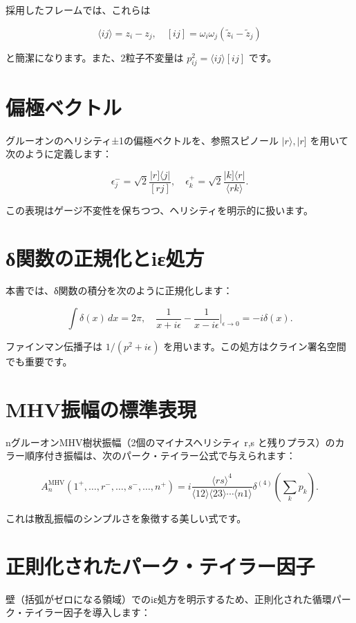 \documentclass[dvipdfmx,a4paper]{jsbook}
\theoremstyle{definition}
\theoremstyle{remark}
\begin{document}
採用したフレームでは、これらは

\[
\langle ij \rangle = z_i - z_j, \quad [ij] = \omega_i \omega_j (\tilde{z}_i - \tilde{z}_j)
\]

と簡潔になります。また、2粒子不変量は \(p_{ij}^2 = \langle ij \rangle [ij]\) です。

\section{偏極ベクトル}

グルーオンのヘリシティ±1の偏極ベクトルを、参照スピノール \(|r\rangle, |r]\) を用いて次のように定義します：

\[
\epsilon_j^- = \sqrt{2} \frac{|r] \langle j |}{[rj]}, \quad \epsilon_k^+ = \sqrt{2} \frac{|k] \langle r |}{\langle rk \rangle}.
\]

この表現はゲージ不変性を保ちつつ、ヘリシティを明示的に扱います。

\section{δ関数の正規化とiε処方}

本書では、δ関数の積分を次のように正規化します：

\[
\int \delta(x) \, dx = 2\pi, \quad \frac{1}{x + i\epsilon} - \frac{1}{x - i\epsilon} \bigg|_{\epsilon \to 0} = -i \delta(x).
\]

ファインマン伝播子は \(1/(p^2 + i\epsilon)\) を用います。この処方はクライン署名空間でも重要です。

\section{MHV振幅の標準表現}

nグルーオンMHV樹状振幅（2個のマイナスヘリシティ r,s と残りプラス）のカラー順序付き振幅は、次のパーク・テイラー公式で与えられます：

\[
A_n^{\text{MHV}}(1^+, \dots, r^-, \dots, s^-, \dots, n^+) = i \frac{\langle rs \rangle^4}{\langle 12 \rangle \langle 23 \rangle \cdots \langle n1 \rangle} \delta^{(4)}\left( \sum_k p_k \right).
\]

これは散乱振幅のシンプルさを象徴する美しい式です。

\section{正則化されたパーク・テイラー因子}

壁（括弧がゼロになる領域）でのiε処方を明示するため、正則化された循環パーク・テイラー因子を導入します：
\end{document}
